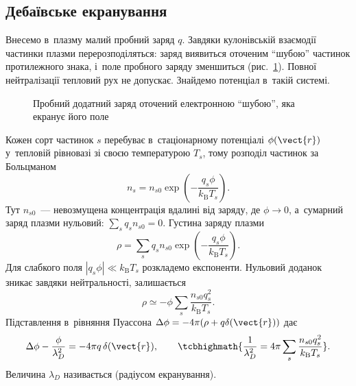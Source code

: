 \subsection*{Дебаївське екранування}



Внесемо в~плазму малий пробний заряд $q$. Завдяки кулонівській взаємодії частинки плазми
перерозподіляться: заряд виявиться оточеним \enquote{шубою} частинок протилежного знака,
і~поле пробного заряду зменшиться (рис.~\ref{tikz:debye-sphere}). Повної нейтралізації
тепловий рух не допускає. Знайдемо потенціал в~такій системі.

\begin{figure}\centering
	\caption{Пробний додатний заряд оточений електронною \enquote{шубою}, яка екранує його
		поле}
	\label{tikz:debye-sphere}
\end{figure}

Кожен сорт частинок $s$ перебуває в~стаціонарному потенціалі $\phi(\vect{r})$
у~тепловій рівновазі зі своєю температурою $T_s$, тому розподіл частинок за Больцманом
\begin{equation*}
	n_s=n_{s0}\exp\left(-\frac{q_s\phi}{k_{\mathrm B}T_s}\right).
\end{equation*}
Тут $n_{s0}$~--- невозмущена концентрація вдалині від заряду, де $\phi\to0$, а~сумарний
заряд плазми нульовий: $\sum_sq_sn_{s0}=0$. Густина заряду плазми
\begin{equation*}
	\rho=\sum_sq_sn_{s0}\exp\left(-\frac{q_s\phi}{k_{\mathrm B}T_s}\right).
\end{equation*}
Для слабкого поля $|q_s\phi|\ll k_{\mathrm B}T_s$ розкладемо експоненти. Нульовий
доданок зникає завдяки нейтральності, залишається
\begin{equation*}
	\rho\simeq-\phi\sum_s\frac{n_{s0}q_s^2}{k_{\mathrm B}T_s}.
\end{equation*}
Підставлення в~рівняння Пуассона $\Delta\phi=-4\pi(\rho+q\delta(\vect{r}))$ дає
\begin{equation}\label{eq:poisson-screened}
	\Delta\phi-\frac{\phi}{\lambda_D^2}=-4\pi q\,\delta(\vect{r}),
	\qquad
	\tcbhighmath{\frac{1}{\lambda_D^2}=4\pi\sum_s\frac{n_{s0}q_s^2}{k_{\mathrm B}T_s}}.
\end{equation}
Величина $\lambda_D$ називається  (радіусом екранування).

